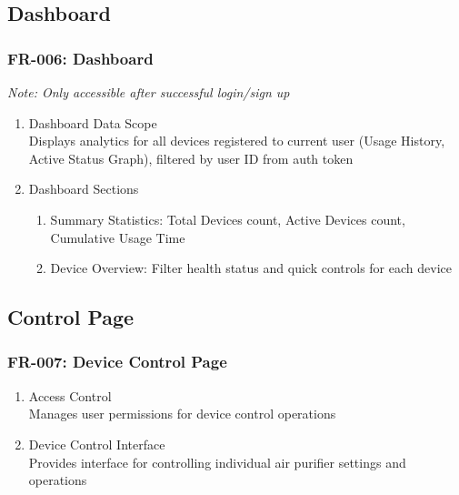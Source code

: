\documentclass[conference]{IEEEtran}
\begin{document}
\subsection{\textbf{Dashboard}}

\subsubsection{FR-006: Dashboard}

\textit{Note: Only accessible after successful login/sign up}

\begin{enumerate}
\item Dashboard Data Scope\\
Displays analytics for all devices registered to current user (Usage History, Active Status Graph), filtered by user ID from auth token

\item Dashboard Sections
    \begin{enumerate}
    \item Summary Statistics: Total Devices count, Active Devices count, Cumulative Usage Time
    \item Device Overview: Filter health status and quick controls for each device
    \end{enumerate}
\end{enumerate}

\subsection{\textbf{Control Page}}

\subsubsection{FR-007: Device Control Page}

\begin{enumerate}
\item Access Control\\
Manages user permissions for device control operations

\item Device Control Interface\\
Provides interface for controlling individual air purifier settings and operations
\end{enumerate}
\end{document}
